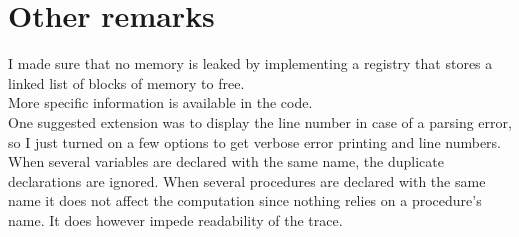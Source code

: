 \section{Other remarks}

I made sure that no memory is leaked by implementing a registry
that stores a linked list of blocks of memory to free.\\
More specific information is available in the code.\\

One suggested extension was to display the line number in case
of a parsing error, so I just turned on a few options to get
verbose error printing and line numbers.\\

When several variables are declared with the same name, the
duplicate declarations are ignored. When several procedures are
declared with the same name it does not affect the computation
since nothing relies on a procedure's name. It does however impede
readability of the trace.
